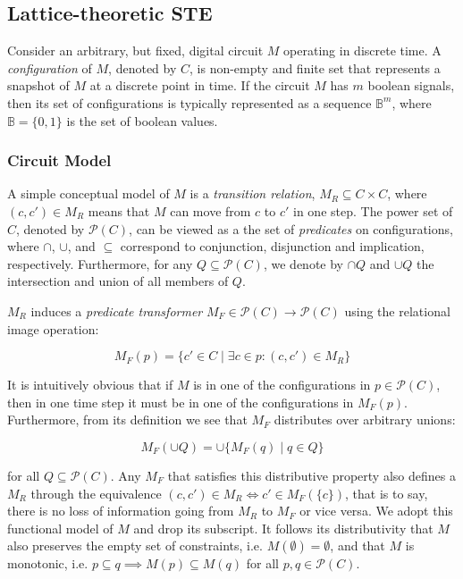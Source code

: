 \subsection{Lattice-theoretic STE}

Consider an arbitrary, but fixed, digital circuit $M$ operating in discrete time. A \textit{configuration} of $M$, denoted by $C$, is non-empty and finite set that represents a snapshot of $M$ at a discrete point in time. If the circuit $M$ has $m$ boolean signals, then its set of configurations is typically represented as a sequence $\mathbb{B}^{m}$, where $\mathbb{B} = \{ 0,1 \}$ is the set of boolean values.

\subsubsection{Circuit Model} A simple conceptual model of $M$ is a \textit{transition relation}, $M_{R} \subseteq C \times C$, where $(c,c') \in M_{R}$ means that $M$ can move from $c$ to $c'$ in one step\footnotemark. The power set of $C$, denoted by $\mathcal{P}(C)$, can be viewed as a the set of \textit{predicates} on configurations, where $\cap$, $\cup$, and $\subseteq$ correspond to conjunction, disjunction and implication, respectively. Furthermore, for any $Q \subseteq \mathcal{P}(C)$, we denote by $\cap Q$ and $\cup Q$ the intersection and union of all members of $Q$.


$M_{R}$ induces a \textit{predicate transformer} $M_{F} \in \mathcal{P}(C) \rightarrow \mathcal{P}(C)$ using the relational image operation:

\begin{equation*}
M_{F}(p) = \{ c' \in C \mid \exists c \in p : (c,c') \in M_{R} \}
\end{equation*}

\noindent It is intuitively obvious that if $M$ is in one of the configurations in $p \in \mathcal{P}(C)$, then in one time step it must be in one of the configurations in $M_{F}(p)$. Furthermore, from its definition we see that $M_{F}$ distributes over arbitrary unions:

\begin{equation*}
M_{F}(\cup Q) = \cup \{ M_{F}(q) \mid q \in Q \}
\end{equation*}

\noindent for all $Q \subseteq \mathcal{P}(C)$. Any $M_{F}$ that satisfies this distributive property also defines a $M_{R}$ through the equivalence $(c,c') \in M_{R} \iff c' \in M_{F}(\{ c \})$, that is to say, there is no loss of information going from $M_{R}$ to $M_{F}$ or vice versa. We adopt this functional model of $M$ and drop its subscript. It follows its distributivity that $M$ also preserves the empty set of constraints, i.e. $M(\emptyset) = \emptyset$, and that $M$ is monotonic, i.e. $p \subseteq q \implies M(p) \subseteq M(q)$ for all $p, q \in \mathcal{P}(C)$.


